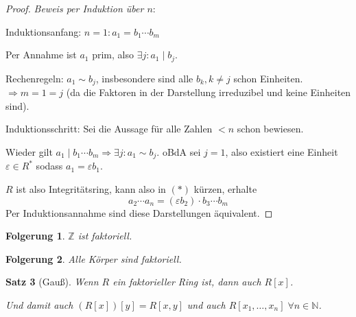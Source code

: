 \documentclass[a4paper,12pt,numbers=noenddot,parskip=full]{scrartcl}
\newcommand{\setN}{\mathbb{N}}
\newcommand{\setZ}{\mathbb{Z}}
\theoremstyle{dotless}
\newtheorem{theorem}{Satz}[section]
\newtheorem{corollary}[theorem]{Folgerung}
\theoremstyle{remark}
\begin{document}
\begin{proof}
		\textit{Beweis per Induktion über $n$}:
		
		Induktionsanfang: $n = 1: a_1 = b_1 \cdots b_m$
		
		Per Annahme ist $a_1$ prim, also $\exists j: a_1 \mid b_j$.
		
		Rechenregeln: $a_1 \sim b_j$, insbesondere sind alle $b_k, k \neq j$ schon Einheiten. $\Rightarrow m = 1 = j$ (da die Faktoren in der Darstellung irreduzibel und keine Einheiten sind).
		
		Induktionsschritt: Sei die Aussage für alle Zahlen $< n$ schon bewiesen.
		
		Wieder gilt $a_1 \mid b_1 \cdots b_m \Rightarrow \exists j: a_1 \sim b_j$. oBdA sei $j = 1$, also existiert eine Einheit $\varepsilon \in R^*$ sodass $a_1 = \varepsilon b_1$.
		
		$R$ ist also Integritätsring, kann also in $(*)$ kürzen, erhalte
		\begin{equation*}
			a_2 \cdots a_n = (\varepsilon b_2) \cdot b_3 \cdots b_m
		\end{equation*}
		Per Induktionsannahme sind diese Darstellungen äquivalent.
	\end{proof}

	\begin{corollary}
		$\setZ$ ist faktoriell.
	\end{corollary}

	\begin{corollary}
		Alle Körper sind faktoriell.
	\end{corollary}

	\begin{theorem}[Gauß]
		Wenn $R$ ein faktorieller Ring ist, dann auch $R[x]$.
		
		Und damit auch $(R[x])[y] = R[x,y]$ und auch $R[x_1, \dots, x_n] \; \forall n \in \setN$.
	\end{theorem}
\end{document}
